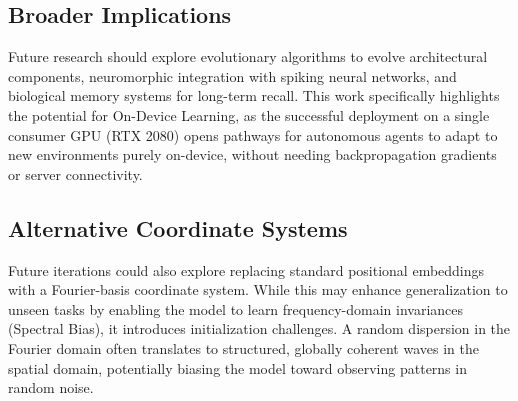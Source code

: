 \documentclass[11pt, letterpaper]{article}
\begin{document}
\subsection{Broader Implications}
Future research should explore evolutionary algorithms to evolve architectural components, neuromorphic integration with spiking neural networks, and biological memory systems for long-term recall. This work specifically highlights the potential for On-Device Learning, as the successful deployment on a single consumer GPU (RTX 2080) opens pathways for autonomous agents to adapt to new environments purely on-device, without needing backpropagation gradients or server connectivity.

\subsection{Alternative Coordinate Systems}
Future iterations could also explore replacing standard positional embeddings with a Fourier-basis coordinate system. While this may enhance generalization to unseen tasks by enabling the model to learn frequency-domain invariances (Spectral Bias), it introduces initialization challenges. A random dispersion in the Fourier domain often translates to structured, globally coherent waves in the spatial domain, potentially biasing the model toward observing patterns in random noise.
\end{document}
